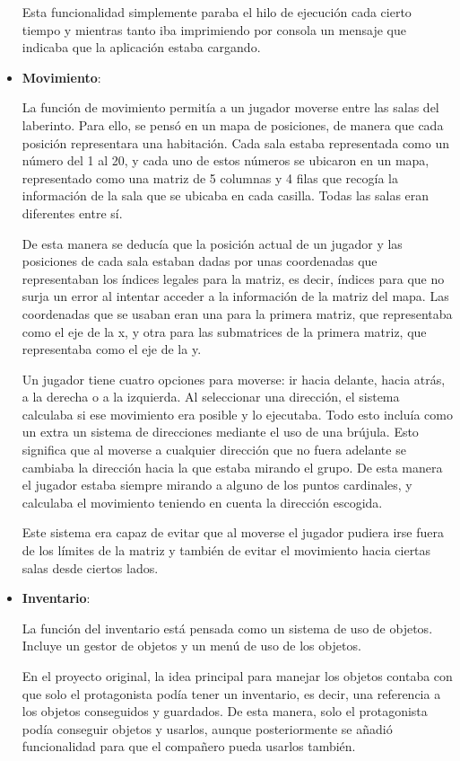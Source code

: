 \documentclass[12pt]{article}
\begin{document}
\begin{itemize}
	Esta funcionalidad simplemente paraba el hilo de ejecución cada cierto tiempo y mientras tanto iba imprimiendo por consola un mensaje que indicaba que la aplicación estaba cargando.
		
	\item \textbf{Movimiento}:
	
	La función de movimiento permitía a un jugador moverse entre las salas del laberinto. Para ello, se pensó en un mapa de posiciones, de manera que cada posición representara una habitación.
	Cada sala estaba representada como un número del 1 al 20, y cada uno de estos números se ubicaron en un mapa, representado como una matriz de 5 columnas y 4 filas que recogía la información de la sala que se ubicaba en cada casilla. Todas las salas eran diferentes entre sí.
	
	De esta manera se deducía que la posición actual de un jugador y las posiciones de cada sala estaban dadas por unas coordenadas que representaban los índices legales para la matriz, es decir, índices para que no surja un error al intentar acceder a la información de la matriz del mapa. Las coordenadas que se usaban eran una para la primera matriz, que representaba como el eje de la x, y otra para las submatrices de la primera matriz, que representaba como el eje de la y.
		
	Un jugador tiene cuatro opciones para moverse: ir hacia delante, hacia atrás, a la derecha o a la izquierda. Al seleccionar una dirección, el sistema calculaba si ese movimiento era posible y lo ejecutaba.
	Todo esto incluía como un extra un sistema de direcciones mediante el uso de una brújula. Esto significa que al moverse a cualquier dirección que no fuera adelante se cambiaba la dirección hacia la que estaba mirando el grupo. De esta manera el jugador estaba siempre mirando a alguno de los puntos cardinales, y calculaba el movimiento teniendo en cuenta la dirección escogida.
	
	Este sistema era capaz de evitar que al moverse el jugador pudiera irse fuera de los límites de la matriz y también de evitar el movimiento hacia ciertas salas desde ciertos lados.
		
	\item \textbf{Inventario}:
	
	La función del inventario está pensada como un sistema de uso de objetos. Incluye un gestor de objetos y un menú de uso de los objetos.
	
	En el proyecto original, la idea principal para manejar los objetos contaba con que solo el protagonista podía tener un inventario, es decir, una referencia a los objetos conseguidos y guardados. De esta manera, solo el protagonista podía conseguir objetos y usarlos, aunque posteriormente se añadió funcionalidad para que el compañero pueda usarlos también.
	

\end{itemize}
\end{document}
